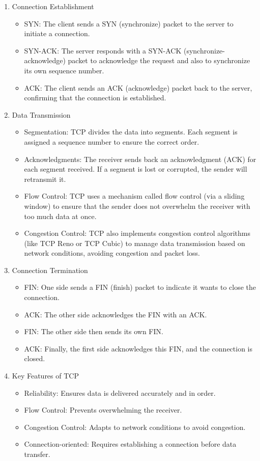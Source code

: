 \documentclass{article}
\begin{document}
\begin{enumerate}[label = \arabic*]
\item Connection Establishment
	\begin{itemize}
	\item SYN: The client sends a SYN (synchronize) packet to the server to initiate a connection.
	\item SYN-ACK: The server responds with a SYN-ACK (synchronize-acknowledge) packet to acknowledge the request and also to synchronize its own sequence number.
	\item ACK: The client sends an ACK (acknowledge) packet back to the server, confirming that the connection is established.
	\end{itemize}
\item Data Transmission
	\begin{itemize}
	\item Segmentation: TCP divides the data into segments. Each segment is assigned a sequence number to ensure the correct order.
	\item Acknowledgments: The receiver sends back an acknowledgment (ACK) for each segment received. If a segment is lost or corrupted, the sender will retransmit it.
	\item Flow Control: TCP uses a mechanism called flow control (via a sliding window) to ensure that the sender does not overwhelm the receiver with too much data at once.
	\item Congestion Control: TCP also implements congestion control algorithms (like TCP Reno or TCP Cubic) to manage data transmission based on network conditions, avoiding congestion and packet loss.
	\end{itemize}
\item Connection Termination
	\begin{itemize}
	\item FIN: One side sends a FIN (finish) packet to indicate it wants to close the connection.
	\item ACK: The other side acknowledges the FIN with an ACK.
	\item FIN: The other side then sends its own FIN.
	\item ACK: Finally, the first side acknowledges this FIN, and the connection is closed.
	\end{itemize}
\item Key Features of TCP
	\begin{itemize}
	\item Reliability: Ensures data is delivered accurately and in order.
	\item Flow Control: Prevents overwhelming the receiver.
	\item Congestion Control: Adapts to network conditions to avoid congestion.
	\item Connection-oriented: Requires establishing a connection before data transfer.
	\end{itemize}
\end{enumerate}
\end{document}
